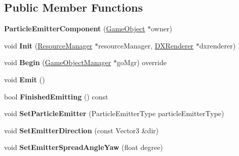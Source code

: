 \subsection*{Public Member Functions}
\begin{DoxyCompactItemize}
\item 
\mbox{\label{classParticleEmitterComponent_a86231997dc231c5575116784ea6aaaa3}} 
{\bfseries Particle\+Emitter\+Component} (\hyperlink{classGameObject}{Game\+Object} $\ast$owner)
\item 
\mbox{\label{classParticleEmitterComponent_ace8b753108a862794dacc0455707d791}} 
void {\bfseries Init} (\hyperlink{classResourceManager}{Resource\+Manager} $\ast$resource\+Manager, \hyperlink{classDXRenderer}{D\+X\+Renderer} $\ast$dxrenderer)
\item 
\mbox{\label{classParticleEmitterComponent_a67e362d6c3791ded19c4011f2fe12c19}} 
void {\bfseries Begin} (\hyperlink{classGameObjectManager}{Game\+Object\+Manager} $\ast$go\+Mgr) override
\item 
\mbox{\label{classParticleEmitterComponent_afc4bb362afd3a8ca0617dc718290dcf8}} 
void {\bfseries Emit} ()
\item 
\mbox{\label{classParticleEmitterComponent_a4d91b32c053338e691b371aafbdd9436}} 
bool {\bfseries Finished\+Emitting} () const
\item 
\mbox{\label{classParticleEmitterComponent_af3b8d001c86a67fb09cf955c1a735af5}} 
void {\bfseries Set\+Particle\+Emitter} (Particle\+Emitter\+Type particle\+Emitter\+Type)
\item 
\mbox{\label{classParticleEmitterComponent_ad600125d3f9a5989c60a7726dea2dec2}} 
void {\bfseries Set\+Emitter\+Direction} (const Vector3 \&dir)
\item 
\mbox{\label{classParticleEmitterComponent_a4e0615191415af6d3534e66b1cfa3b1c}} 
void {\bfseries Set\+Emitter\+Spread\+Angle\+Yaw} (float degree)
\item 
\mbox{\label{classParticleEmitterComponent_a9ca65ff05b2dfe29d99af163b67d84e9}} 

\end{DoxyCompactItemize}
